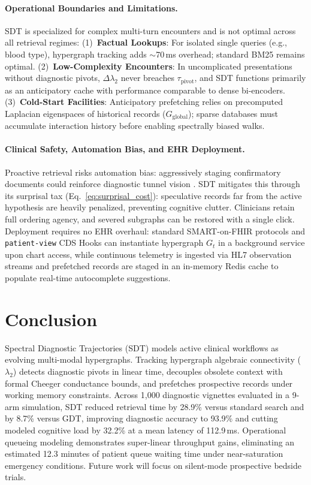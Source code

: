 \documentclass[10pt, onecolumn]{article}
\begin{document}
\paragraph{Operational Boundaries and Limitations.}
SDT is specialized for complex multi-turn encounters and is not optimal across all retrieval regimes: (1)~\textbf{Factual Lookups}: For isolated single queries (e.g., blood type), hypergraph tracking adds $\sim$70\,ms overhead; standard BM25 remains optimal. (2)~\textbf{Low-Complexity Encounters}: In uncomplicated presentations without diagnostic pivots, $\Delta \lambda_2$ never breaches $\tau_{\text{pivot}}$, and SDT functions primarily as an anticipatory cache with performance comparable to dense bi-encoders. (3)~\textbf{Cold-Start Facilities}: Anticipatory prefetching relies on precomputed Laplacian eigenspaces of historical records ($G_{\text{global}}$); sparse databases must accumulate interaction history before enabling spectrally biased walks.

\paragraph{Clinical Safety, Automation Bias, and EHR Deployment.}
Proactive retrieval risks automation bias: aggressively staging confirmatory documents could reinforce diagnostic tunnel vision \cite{goddard2012automation}. SDT mitigates this through its surprisal tax (Eq.~\eqref{eq:surprisal_cost}): speculative records far from the active hypothesis are heavily penalized, preventing cognitive clutter. Clinicians retain full ordering agency, and severed subgraphs can be restored with a single click. Deployment requires no EHR overhaul: standard SMART-on-FHIR protocols and \texttt{patient-view} CDS Hooks can instantiate hypergraph $G_t$ in a background service upon chart access, while continuous telemetry is ingested via HL7 observation streams and prefetched records are staged in an in-memory Redis cache to populate real-time autocomplete suggestions.

\section{Conclusion}
\label{sec:conclusion}

Spectral Diagnostic Trajectories (SDT) models active clinical workflows as evolving multi-modal hypergraphs. Tracking hypergraph algebraic connectivity ($\lambda_2$) detects diagnostic pivots in linear time, decouples obsolete context with formal Cheeger conductance bounds, and prefetches prospective records under working memory constraints. Across 1{,}000 diagnostic vignettes evaluated in a 9-arm simulation, SDT reduced retrieval time by 28.9\% versus standard search and by 8.7\% versus GDT, improving diagnostic accuracy to 93.9\% and cutting modeled cognitive load by 32.2\% at a mean latency of 112.9\,ms. Operational queueing modeling demonstrates super-linear throughput gains, eliminating an estimated 12.3 minutes of patient queue waiting time under near-saturation emergency conditions. Future work will focus on silent-mode prospective bedside trials.
\end{document}
